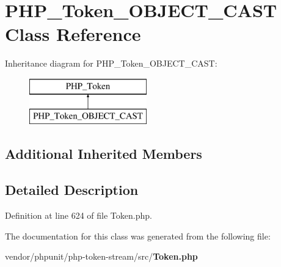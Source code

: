 \section{P\+H\+P\+\_\+\+Token\+\_\+\+O\+B\+J\+E\+C\+T\+\_\+\+C\+A\+S\+T Class Reference}
\label{class_p_h_p___token___o_b_j_e_c_t___c_a_s_t}
Inheritance diagram for P\+H\+P\+\_\+\+Token\+\_\+\+O\+B\+J\+E\+C\+T\+\_\+\+C\+A\+S\+T\+:\begin{figure}[H]
\begin{center}
\leavevmode
\includegraphics[height=2.000000cm]{class_p_h_p___token___o_b_j_e_c_t___c_a_s_t}
\end{center}
\end{figure}
\subsection*{Additional Inherited Members}


\subsection{Detailed Description}


Definition at line 624 of file Token.\+php.



The documentation for this class was generated from the following file\+:\begin{DoxyCompactItemize}
\item 
vendor/phpunit/php-\/token-\/stream/src/{\bf Token.\+php}\end{DoxyCompactItemize}
